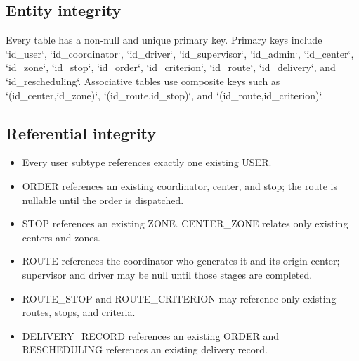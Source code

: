 \documentclass[12pt,a4paper]{article}
\begin{document}
\subsection{Entity integrity}
Every table has a non-null and unique primary key. Primary keys include `id\_user`, `id\_coordinator`, `id\_driver`, `id\_supervisor`, `id\_admin`, `id\_center`, `id\_zone`, `id\_stop`, `id\_order`, `id\_criterion`, `id\_route`, `id\_delivery`, and `id\_rescheduling`. Associative tables use composite keys such as `(id\_center,id\_zone)`, `(id\_route,id\_stop)`, and `(id\_route,id\_criterion)`.

\subsection{Referential integrity}
\begin{itemize}
\item Every user subtype references exactly one existing USER.
\item ORDER references an existing coordinator, center, and stop; the route is nullable until the order is dispatched.
\item STOP references an existing ZONE. CENTER\_ZONE relates only existing centers and zones.
\item ROUTE references the coordinator who generates it and its origin center; supervisor and driver may be null until those stages are completed.
\item ROUTE\_STOP and ROUTE\_CRITERION may reference only existing routes, stops, and criteria.
\item DELIVERY\_RECORD references an existing ORDER and RESCHEDULING references an existing delivery record.
\end{itemize}
\end{document}
